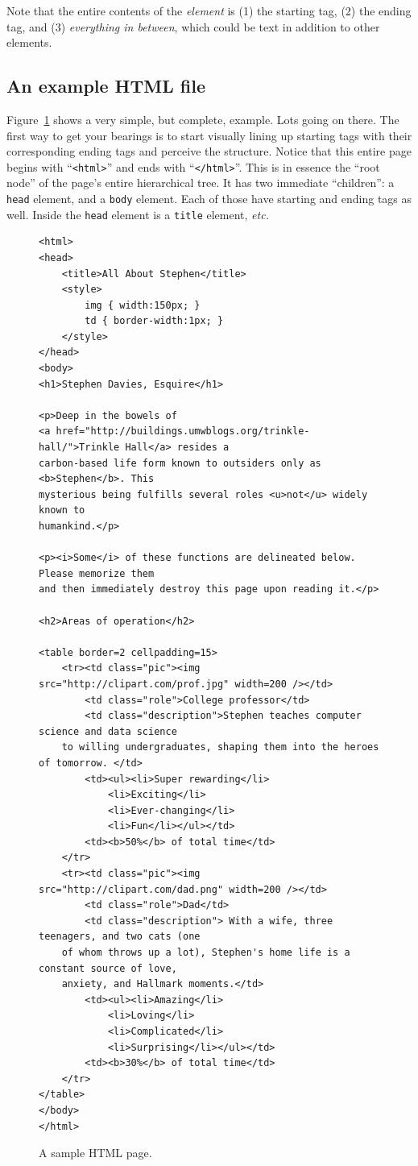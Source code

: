 Note that the entire contents of the \textit{element} is (1) the starting tag,
(2) the ending tag, and (3) \textit{everything in between}, which could be
text in addition to other elements.

\subsection{An example HTML file}

Figure~\ref{fig:allAboutStephen} shows a very simple, but complete, example.
Lots going on there. The first way to get your bearings is to start visually
lining up starting tags with their corresponding ending tags and perceive the
structure. Notice that this entire page begins with ``\texttt{<html>}'' and
ends with ``\texttt{</html>}''. This is in essence the ``root node'' of the
page's entire hierarchical tree. It has two immediate ``children'': a
\texttt{head} element, and a \texttt{body} element. Each of those have
starting and ending tags as well. Inside the \texttt{head} element is a
\texttt{title} element, \textit{etc.}

\begin{figure}
\centering
\begin{Verbatim}[fontsize=\scriptsize,samepage=true,frame=lines]
<html>
<head>
    <title>All About Stephen</title>
    <style>
        img { width:150px; }
        td { border-width:1px; }
    </style>
</head>
<body>
<h1>Stephen Davies, Esquire</h1>

<p>Deep in the bowels of
<a href="http://buildings.umwblogs.org/trinkle-hall/">Trinkle Hall</a> resides a
carbon-based life form known to outsiders only as <b>Stephen</b>. This
mysterious being fulfills several roles <u>not</u> widely known to
humankind.</p>

<p><i>Some</i> of these functions are delineated below. Please memorize them
and then immediately destroy this page upon reading it.</p>

<h2>Areas of operation</h2>

<table border=2 cellpadding=15>
    <tr><td class="pic"><img src="http://clipart.com/prof.jpg" width=200 /></td>
        <td class="role">College professor</td>
        <td class="description">Stephen teaches computer science and data science
    to willing undergraduates, shaping them into the heroes of tomorrow. </td>
        <td><ul><li>Super rewarding</li>
            <li>Exciting</li>
            <li>Ever-changing</li>
            <li>Fun</li></ul></td>
        <td><b>50%</b> of total time</td>
    </tr>
    <tr><td class="pic"><img src="http://clipart.com/dad.png" width=200 /></td>
        <td class="role">Dad</td>
        <td class="description"> With a wife, three teenagers, and two cats (one
    of whom throws up a lot), Stephen's home life is a constant source of love,
    anxiety, and Hallmark moments.</td>
        <td><ul><li>Amazing</li>
            <li>Loving</li>
            <li>Complicated</li>
            <li>Surprising</li></ul></td>
        <td><b>30%</b> of total time</td>
    </tr>
</table>
</body>
</html>
\end{Verbatim}
\caption{A sample HTML page.}
\label{fig:allAboutStephen}
\end{figure}

